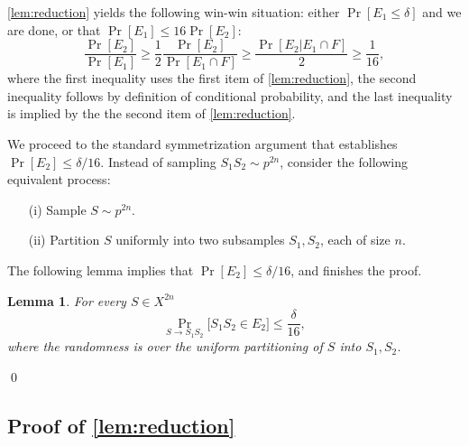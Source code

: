 \documentclass{article}
\newtheorem{lemma}[theorem]{Lemma}
\begin{document}
\ref{lem:reduction} yields the following win-win situation:
either $\Pr[E_1 \leq \delta]$ and we are done, 
or that $\Pr[E_1]\leq 16\Pr[E_2]$:
\[\frac{\Pr[E_2]}{\Pr[E_1]} \geq  \frac{1}{2}\frac{\Pr[E_2]}{\Pr[E_1\cap F]} \geq \frac{\Pr[E_2 \vert E_1\cap F]}{2} \geq \frac{1}{16},\]
where the first inequality uses the first item of \ref{lem:reduction}, 
the second inequality follows by definition of conditional probability,
and the last inequality is implied by the the second item of \ref{lem:reduction}.


We proceed to the standard symmetrization argument
that establishes $\Pr[E_2]\leq\delta/16$. 
Instead of sampling $S_1S_2\sim p^{2n}$,
consider the following equivalent process:
\begin{itemize}
\item[(i)] Sample $S\sim p^{2n}$.
\item[(ii)] Partition $S$ uniformly into two subsamples $S_1,S_2$, each of size $n$.
\end{itemize}
The following lemma implies that $\Pr[E_2]\leq \delta/16$, and finishes the proof.
\begin{lemma}\label{lem:e2}
For every $S\in X^{2n}$
\[\Pr_{S\to S_1S_2}\bigl[S_1S_2\in E_2\bigr]\leq \frac{\delta}{16},\]
where the randomness is over the uniform partitioning
of $S$ into $S_1,S_2$.
\end{lemma}
\qed

\subsection{Proof of \ref{lem:reduction}}
\end{document}

